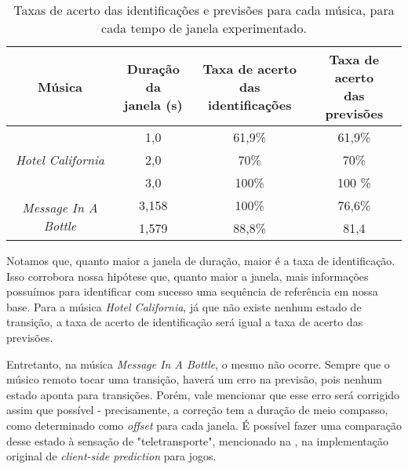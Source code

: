\begin{table}[ht!]
    \centering
    \begin{tabular}{|c|c|c|c|}
        \hline
        Música & \makecell{Duração da \\ janela (s)} & \makecell{Taxa de acerto \\ das identificações} & \makecell{Taxa de acerto \\ das previsões}\\
        
        \hline
        \hline
        
        \multirow{3}{5em}{\centering \textit{Hotel California}} & 1,0 & 61,9\% & 61,9\% \\ 
        \cline{2-4}
        
        & 2,0 & 70\% & 70\% \\ 
        \cline{2-4}
        
        & 3,0 & 100\% & 100 \% \\ 
        
        \hline
        
        \multirow{2}{5em}{\centering \textit{Message In A Bottle}} & 3,158 & 100\% & 76,6\% \\ 
        \cline{2-4}
        
        & 1,579 & 88,8\% & 81,4 \\ 
        \cline{2-4}
        
        \hline
    \end{tabular}
    \caption{Taxas de acerto das identificações e previsões para cada música, para cada tempo de janela experimentado.}
    \label{tab:dtw_results_correctness}
\end{table}

Notamos que, quanto maior a janela de duração, maior é a taxa de identificação. Isso corrobora nossa hipótese que, quanto maior a janela, mais informações possuímos para identificar com sucesso uma sequência de referência em nossa base. Para a música \textit{Hotel California}, já que não existe nenhum estado de transição, a taxa de acerto de identificação será igual a taxa de acerto das previsões.

Entretanto, na música \textit{Message In A Bottle}, o mesmo não ocorre. Sempre que o músico remoto tocar uma transição, haverá um erro na previsão, pois nenhum estado aponta para transições. Porém, vale mencionar que esse erro será corrigido assim que possível - precisamente, a correção tem a duração de meio compasso, como determinado como \textit{offset} para cada janela. É possível fazer uma comparação desse estado à sensação de "teletransporte", mencionado na , na implementação original de \textit{client-side prediction} para jogos.

